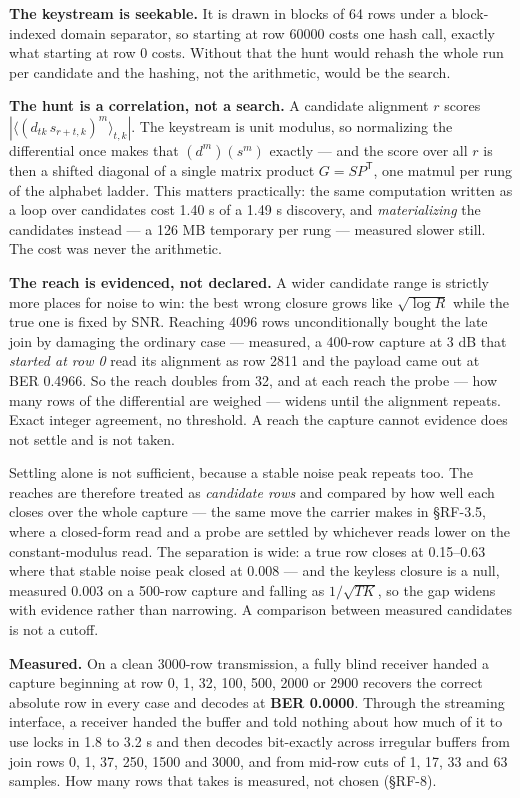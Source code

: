 \documentclass[10pt,letterpaper,twocolumn]{article}
\begin{document}
\textbf{The keystream is seekable.} It is drawn in blocks of 64 rows under a block-indexed domain separator, so starting at row 60000 costs one hash call, exactly what starting at row 0 costs. Without that the hunt would rehash the whole run per candidate and the hashing, not the arithmetic, would be the search.

\textbf{The hunt is a correlation, not a search.} A candidate alignment \(r\) scores \(|\langle (d_{tk}\,s_{r+t,k})^m \rangle_{t,k}|\). The keystream is unit modulus, so normalizing the differential once makes that \((d^m)(s^m)\) exactly --- and the score over all \(r\) is then a shifted diagonal of a single matrix product \(G = S P^\mathsf{T}\), one matmul per rung of the alphabet ladder. This matters practically: the same computation written as a loop over candidates cost 1.40 s of a 1.49 s discovery, and \emph{materializing} the candidates instead --- a 126 MB temporary per rung --- measured slower still. The cost was never the arithmetic.

\textbf{The reach is evidenced, not declared.} A wider candidate range is strictly more places for noise to win: the best wrong closure grows like \(\sqrt{\log R}\) while the true one is fixed by SNR. Reaching 4096 rows unconditionally bought the late join by damaging the ordinary case --- measured, a 400-row capture at 3 dB that \emph{started at row 0} read its alignment as row 2811 and the payload came out at BER 0.4966. So the reach doubles from 32, and at each reach the probe --- how many rows of the differential are weighed --- widens until the alignment repeats. Exact integer agreement, no threshold. A reach the capture cannot evidence does not settle and is not taken.

Settling alone is not sufficient, because a stable noise peak repeats too. The reaches are therefore treated as \emph{candidate rows} and compared by how well each closes over the whole capture --- the same move the carrier makes in §RF-3.5, where a closed-form read and a probe are settled by whichever reads lower on the constant-modulus read. The separation is wide: a true row closes at 0.15--0.63 where that stable noise peak closed at 0.008 --- and the keyless closure is a null, measured 0.003 on a 500-row capture and falling as \(1/\sqrt{TK}\), so the gap widens with evidence rather than narrowing. A comparison between measured candidates is not a cutoff.

\textbf{Measured.} On a clean 3000-row transmission, a fully blind receiver handed a capture beginning at row 0, 1, 32, 100, 500, 2000 or 2900 recovers the correct absolute row in every case and decodes at \textbf{BER 0.0000}. Through the streaming interface, a receiver handed the buffer and told nothing about how much of it to use locks in 1.8 to 3.2 s and then decodes bit-exactly across irregular buffers from join rows 0, 1, 37, 250, 1500 and 3000, and from mid-row cuts of 1, 17, 33 and 63 samples. How many rows that takes is measured, not chosen (§RF-8).
\end{document}
